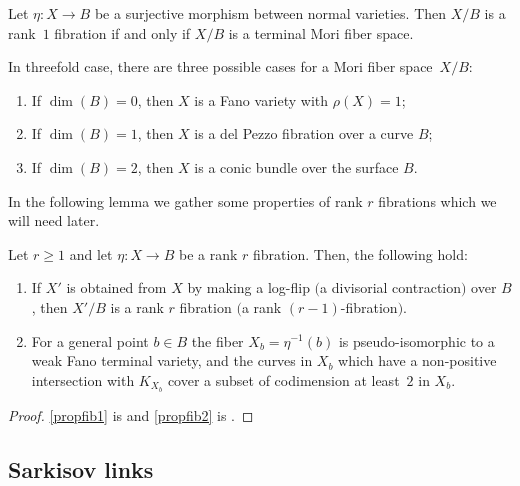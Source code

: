 \begin{prop}
Let $\eta: X\to B$ be a surjective morphism between normal varieties. Then $X/B$ is a rank~$1$ fibration if and only if $X/B$ is a terminal Mori fiber space.
\end{prop}
\begin{rem}
In threefold case, there are three possible cases for a Mori fiber space~$X/B$:
\begin{enumerate}
\item If $\dim(B)=0$, then $X$ is a Fano variety with $\rho(X)=1$;
\item If $\dim(B)=1$, then $X$ is a del Pezzo fibration over a curve $B$;
\item If $\dim(B)=2$, then $X$ is a conic bundle over the surface $B$.
\end{enumerate}
\end{rem}

In the following lemma we gather some properties of rank $r$ fibrations which we will need later.

\begin{lem}\label{lem: prop of fibrations}
Let $r\ge 1$ and let $\eta: X\to B$ be a rank $r$ fibration. Then, the following hold:
\begin{enumerate}
\item\label{propfib1} If $X'$ is obtained from $X$ by making a log-flip $($\resp a divisorial contraction$)$ over $B$, then $X'/B$ is a rank $r$ fibration $($\resp a rank $(r-1)$-fibration$)$.
\item\label{propfib2} For a general point $b\in B$ the fiber $X_b=\eta^{-1}(b)$ is pseudo-isomorphic to a weak Fano terminal variety, and the curves in $X_b$ which have a non-positive intersection with $K_{X_b}$ cover a subset of codimension at least~$2$ in $X_b$.
\end{enumerate}
\end{lem}
\begin{proof}
\eqref{propfib1} is \cite[Lem.\,3.4(1)]{BLZ} and \eqref{propfib2} is \cite[Cor.\,3.6]{BLZ}.
\end{proof}

\subsection{Sarkisov links}\label{Sec:SarkisovLinks}

